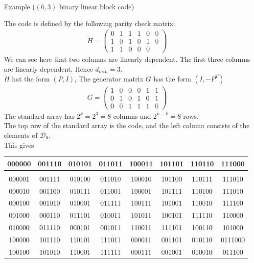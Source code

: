 \begin{parag}{Example ($\left(6, 3\right)$ binary linear block code) }

    The code is defined by the following parity check matrix:
    \begin{align*} 
        H =  \begin{pmatrix} 0&1  & 1 & 1 & 0 & 0 \\ 1 & 0 & 1 & 0 & 1 & 0 \\ 1 & 1 & 0 & 0 & 0 &  \end{pmatrix} 
    \end{align*}
    We can see here that    two columns are linearly dependent. The first three columns are linearly dependent. Hence $d_{min} =  3$.\\
    $H$ hat the form $\left(P, I\right)$, The generator matrix $G$ has the form $\left(I,-P^T\right)$
    \begin{align*} 
        G = \begin{pmatrix} 1 & 0 & 0 & 0 & 1 & 1 \\ 0 & 1 & 0 & 1 & 0 & 1 \\ 0 & 0 & 1 & 1 & 1 & 0  \end{pmatrix} 
    \end{align*}
    The standard array has $2^k = 2^3 = 8$ columns and $2^{n-k} =  8$ rows.\\
    The top row of the standard array is the code, and the left column consists of the elements of $\mathcal{D}_0$.\\
    This gives
    \begin{center} \begin{tabular}{c|ccccccc} 000000& 001110 & 010101 & 011011 & 100011 & 101101 & 110110 & 111000 \\ \hline  \\
    000001 & 001111 & 010100 & 011010 & 100010 & 101100 & 110111 & 111010 \\ 000010 & 001100 & 010111 & 011001 & 100001 & 101111 & 110100 & 111010 \\ 000100 & 001010 & 010001 & 011111 & 100111 & 101001 & 110010 & 111100 \\ 001000 & 000110 & 011101 & 010011 & 101011 & 100101 & 111110 & 110000 \\ 010000 & 011110 & 000101 & 001011 & 110011 & 111101 & 100110 & 101000 \\ 100000 & 101110 & 110101 & 111011 & 000011 & 001101 & 010110 & 0111000 \\ 100100 & 101010 & 110001 & 111111 & 000111 & 001001 & 010010 & 011100 \end{tabular} \end{center} 

\end{parag}
